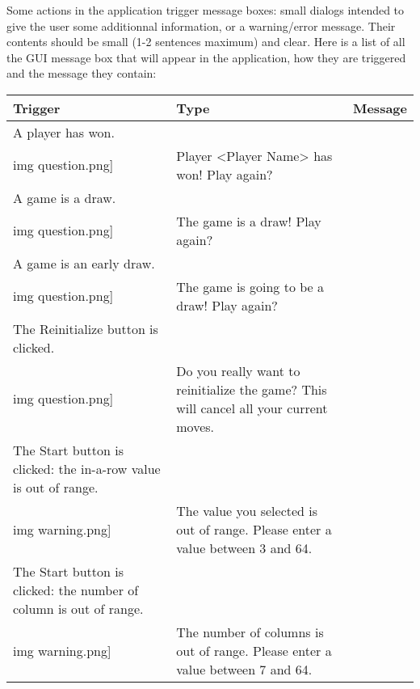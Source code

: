 Some actions in the  application trigger message boxes:
small dialogs intended to give the user some additionnal information, or a
warning/error message. Their contents should be small (1-2 sentences maximum)
and clear. Here is a list of all the GUI message box that will appear in the
 application, how they are triggered and the message they
contain:

\begin{table}[H]
  \centering
  \begin{longtable}{|p{}
                    |p{}
                    |p{}|}
    \hline
    \textbf{Trigger} & \textbf{Type} & \textbf{Message} \\
    \hline
    \hline

    A player has won.                                           &
    \texttt{[image: \\img question.png]} &
    Player <Player Name> has won! Play again?                   \\\hline

    A game is a draw.                                           &
    \texttt{[image: \\img question.png]} &
    The game is a draw! Play again?                             \\\hline

    A game is an early draw.                                    &
    \texttt{[image: \\img question.png]} &
    The game is going to be a draw! Play again?                 \\\hline

    The Reinitialize button is clicked.                            &
    \texttt{[image: \\img question.png]}    &
    Do you really want to reinitialize the game? This will cancel
    all your current moves.                                        \\\hline

    The Start button is clicked: the in-a-row value is out of range. &
    \texttt{[image: \\img warning.png]}       &
    The value you selected is out of range. Please enter a value
    between 3 and 64.                                                \\\hline

    The Start button is clicked: the number of column is out of range.  &
    \texttt{[image: \\img warning.png]}          &
    The number of columns is out of range. Please enter a value between
    7 and 64.                                                           \\\hline


\end{longtable}
\end{table}
